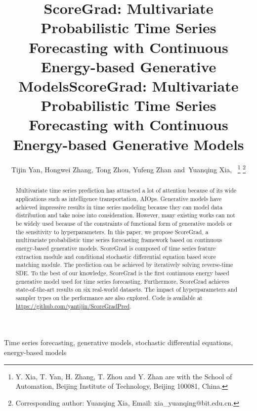 \title{ScoreGrad: Multivariate Probabilistic Time Series Forecasting with Continuous Energy-based Generative Models}



\title{ScoreGrad: Multivariate Probabilistic Time Series Forecasting with Continuous Energy-based Generative Models}

\author{Tijin Yan,
        Hongwei Zhang,
        Tong Zhou,
        Yufeng Zhan
        and~Yuanqing Xia,~%
\thanks{Y. Xia, T. Yan, H. Zhang, T. Zhou and Y. Zhan are with the School of Automation, Beijing
	Institute of Technology, Beijing 100081, China.}
\thanks{Corresponding author: Yuanqing Xia, Email: xia\_yuanqing@bit.edu.cn.}
}

\maketitle

\begin{abstract}
Multivariate time series prediction has attracted a lot of attention because of its wide applications such as intelligence transportation, AIOps. Generative models have achieved impressive results in time series modeling because they can model data distribution and take noise into consideration. However, many existing works can not be widely used because of the constraints of functional form of generative models or the sensitivity to hyperparameters. In this paper, we propose ScoreGrad, a multivariate probabilistic time series forecasting framework based on continuous energy-based generative models. ScoreGrad is composed of time series feature extraction module and conditional stochastic differential equation based score matching module. The prediction can be achieved by  iteratively solving reverse-time SDE. To the best of our knowledge, ScoreGrad is the first continuous energy based generative model used for time series forecasting. Furthermore, ScoreGrad achieves state-of-the-art results on six real-world datasets. The impact of hyperparameters and sampler types on the performance are also explored. Code is available at \url{https://github.com/yantijin/ScoreGradPred}. %
\end{abstract}

\begin{IEEEkeywords}
Time series forecasting, generative models, stochastic differential equations, energy-based models%
\end{IEEEkeywords}

